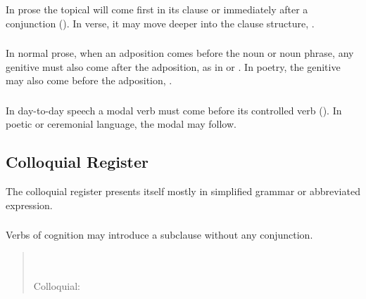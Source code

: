 \subsubsection{} In prose the topical will come first in its clause or
immediately after a conjunction ().
In verse, it may move deeper into the clause structure,
 .

\subsubsection{} In normal prose, when an adposition comes before the
noun or noun phrase, any genitive must also come after the adposition,
as in  or  .  In
poetry, the genitive may also come before the adposition, . 

\subsubsection{} In day-to-day speech a modal verb must come before
its controlled verb ().  In poetic or
ceremonial language, the modal may follow.


\subsection{Colloquial Register} The colloquial register presents
itself mostly in simplified grammar or abbreviated expression.

\subsubsection{} Verbs of cognition may introduce a subclause without
any conjunction.

\begin{quotation}
\noindent{}\\
\noindent{}\\
\noindent Colloquial: 
\end{quotation}


